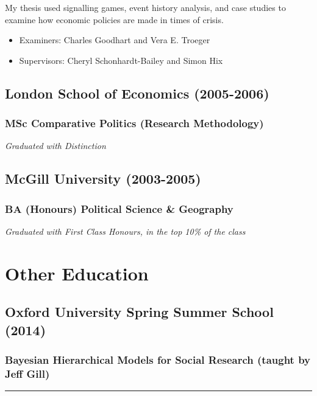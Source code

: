 \documentclass[a4paper]{article}
\begin{document}
\noindent My thesis used signalling games, event history analysis, and case studies to examine how economic policies are made in times of crisis.

\begin{itemize}
    \item Examiners: Charles Goodhart and Vera E. Troeger
    \item Supervisors: Cheryl Schonhardt-Bailey and Simon Hix
\end{itemize}

\subsection*{London School of Economics (2005-2006)}
\subsubsection*{MSc Comparative Politics (Research Methodology)}

{\emph{Graduated with Distinction}}

\subsection*{McGill University (2003-2005)}
\subsubsection*{BA (Honours) Political Science \& Geography}

{\emph{Graduated with First Class Honours, in the top 10\% of the class}}

\section*{Other Education}

\subsection*{Oxford University Spring Summer School (2014)}

\subsubsection*{Bayesian Hierarchical Models for Social Research (taught by Jeff Gill)}

\vspace{0.25cm}
\medskip\hrule height 1pt
\vspace{0.5cm}
\end{document}

